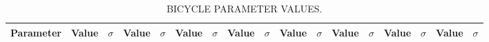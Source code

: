 \documentclass[../report/parameterReport.tex]{subfiles}
\begin{document}
\begin{landscape}
\begin{table}[tb]
\begin{center}
\caption{BICYCLE PARAMETER VALUES.}
{\small
\begin{tabular}{l|rr|rr|rr|rr|rr|rr|rr|rr}
Parameter & Value & $\sigma$ & Value & $\sigma$
          & Value & $\sigma$ & Value & $\sigma$
          & Value & $\sigma$ & Value & $\sigma$
          & Value & $\sigma$ & Value & $\sigma$\\
\hline
\end{tabular}
}
\end{center}
\end{table}
\end{landscape}
\end{document}

